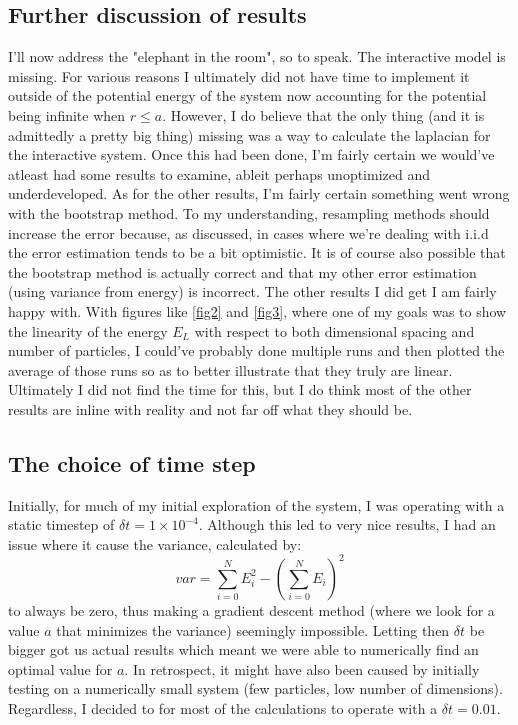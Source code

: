 \documentclass{article}
\begin{document}
\subsection{Further discussion of results}
I'll now address the "elephant in the room", so to speak. The interactive model is missing. For various reasons I ultimately did not have time to implement it outside of the potential energy of the system now accounting for the potential being infinite when $r \leq a$. However, I do believe that the only thing (and it is admittedly a pretty big thing) missing was a way to calculate the laplacian for the interactive system. Once this had been done, I'm fairly certain we would've atleast had some results to examine, ableit perhaps unoptimized and underdeveloped.
\newline
As for the other results, I'm fairly certain something went wrong with the bootstrap method. To my understanding, resampling methods should increase the error because, as discussed, in cases where we're dealing with i.i.d the error estimation tends to be a bit optimistic. It is of course also possible that the bootstrap method is actually correct and that my other error estimation (using variance from energy) is incorrect. \newline
The other results I did get I am fairly happy with. With figures like \ref{fig2} and \ref{fig3}, where one of my goals was to show the linearity of the energy $E_L$ with respect to both dimensional spacing and number of particles, I could've probably done multiple runs and then plotted the average of those runs so as to better illustrate that they truly are linear. Ultimately I did not find the time for this, but I do think most of the other results are inline with reality and not far off what they should be.
\subsection{The choice of time step}
Initially, for much of my initial exploration of the system, I was operating with a static timestep of $\delta t = 1\times10^{-4}$. Although this led to very nice results, I had an issue where it cause the variance, calculated by:
\begin{equation*}
    var = \sum_{i=0}^N E_i^2 - \left(\sum_{i=0}^N E_i \right)^2
\end{equation*}
to always be zero, thus making a gradient descent method (where we look for a value $a$ that minimizes the variance) seemingly impossible. Letting then $\delta t$ be bigger got us actual results which meant we were able to numerically find an optimal value for $a$. \newline
In retrospect, it might have also been caused by initially testing on a numerically small system (few particles, low number of dimensions). Regardless, I decided to for most of the calculations to operate with a $\delta t = 0.01$.
\end{document}
